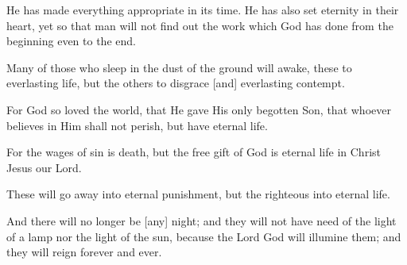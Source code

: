 \begin{scripture}[Ecclesiastes 3:11]
         He has made everything appropriate in its time. 
        He has also set eternity in their heart, yet so that man 
        will not find out the work which God has done from the 
        beginning even to the end.
\end{scripture}

\vspace{2\baselineskip}

\begin{scripture}[Daniel 12:2]
     Many of those who sleep in the dust of the ground will awake, these to everlasting 
    life, but the others to disgrace [and] everlasting contempt.
\end{scripture}

\vspace{2\baselineskip}

\begin{scripture}[John 3:16]
     For God so loved the world, that He gave His
        only begotten Son, that whoever believes in Him shall not perish, but have eternal life.
\end{scripture}

\vspace{2\baselineskip}

\begin{scripture}[Romans 6:23]
         For the wages of sin is death, but the free gift of God is eternal life in Christ Jesus our Lord.
\end{scripture}

\vspace{2\baselineskip}

\begin{scripture}[Matthew 25:46]

         These will go away into eternal punishment, but the righteous into eternal life.
\end{scripture}

\vspace{2\baselineskip}

\begin{scripture}[Revelation 22:5]
         And there will no longer be [any] night; and they will not have need of the light 
        of a lamp nor the light of the sun, because the Lord God will illumine them; and they will 
        reign forever and ever.
\end{scripture}

